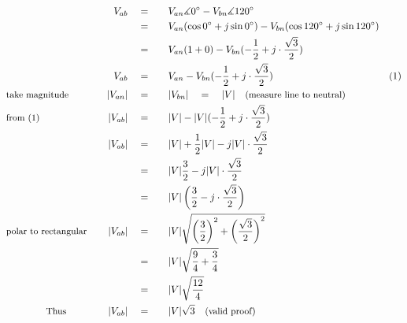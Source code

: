 \begin{alignat*}{5}
&\,&V_{ab}\quad&=\quad&&V_{an}\measuredangle0^\circ-V_{bn}\measuredangle120^\circ\\
&\,&\,&=&& V_{an}(\cos{0^\circ}+j\sin{{0^\circ}})-V_{bn}(\cos{120^\circ}+j\sin{{120^\circ}})\\
&\,&\,&=&&V_{an}(1+0)-V_{bn}(-\frac{1}{2}+j\cdot\frac{\sqrt{3}}{2})\\
&\,&V_{ab}\quad&=&&V_{an}-V_{bn}(-\frac{1}{2}+j\cdot\frac{\sqrt{3}}{2})\quad&\small\text(1)\\
&\small\text{take magnitude}&|V_{an}|\quad&=&&|V_{bn}|\quad=\quad|V|\quad\small\text{(measure line to neutral)}\\
&\small\text{from (1)}&|V_{ab}|\quad&=&&|V|-|V|(-\frac{1}{2}+j\cdot\frac{\sqrt{3}}{2})\\
&\,&|V_{ab}|\quad&=&&|V|+\frac{1}{2}|V|-j|V|\cdot\frac{\sqrt{3}}{2}\\
&\,&\,&=&&|V|\frac{3}{2}-j|V|\cdot\frac{\sqrt{3}}{2}\\
&\,&\,&=&&|V|\left(\frac{3}{2}-j\cdot\frac{\sqrt{3}}{2}\right)\\
&\small\text{polar to rectangular}\normalsize\quad&|V_{ab}|\quad&=&&|V|\sqrt{\left(\frac{3}{2}\right)^2+\left(\frac{\sqrt{3}}{2}\right)^2}\\
&\,&\,&=&&|V|\sqrt{\frac{9}{4}+\frac{3}{4}}\\
&\,&\,&=&&|V|\sqrt{\frac{12}{4}}\\
&\qquad\qquad\small\text{Thus}\normalsize\quad&|V_{ab}|\quad&=&&|V|\sqrt{3}\quad\small\text{(valid proof)}\\
\end{alignat*}
